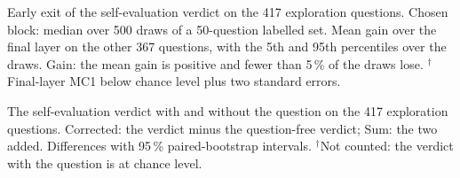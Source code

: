 \documentclass[11pt]{article}
\begin{document}
\begin{table}[h]
\centering\small\setlength{\tabcolsep}{4pt}
\caption{Early exit of the self-evaluation verdict on the 417 exploration questions. Chosen block: median over 500
draws of a 50-question labelled set. Mean gain over the final layer on the other 367 questions, with the 5th and
95th percentiles over the draws. Gain: the mean gain is positive and fewer than 5\,\% of the draws lose.
$^\dagger$Final-layer MC1 below chance level plus two standard errors.}
\label{tab:earlyexit}
\end{table}

\begin{table}[h]
\centering\small\setlength{\tabcolsep}{3.5pt}
\caption{The self-evaluation verdict with and without the question on the 417 exploration questions. Corrected: the
verdict minus the question-free verdict; Sum: the two added. Differences with 95\,\% paired-bootstrap intervals.
$^\dagger$Not counted: the verdict with the question is at chance level.}
\label{tab:questionremoved}
\end{table}
\end{document}

